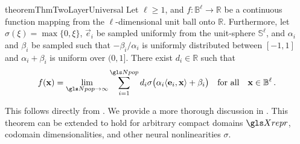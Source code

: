 \begin{restatable}{theorem}{ThmTwoLayerUniversal}
\label{thm:two_layer_universal}
Let $\ell \geq 1$, and $f : \mathbb{B}^\ell \longrightarrow \mathbb{R}$ be a continuous function mapping from the $\ell$-dimensional unit ball onto $\mathbb{R}$.
Furthermore, let $\sigma(\xi) = \max\{0, \xi\}$, $\vec e_i$ be sampled uniformly from the unit-sphere $\mathbb{S}^\ell$, and $\alpha_i$ and $\beta_i$ be sampled such that $-\beta_i / \alpha_i$ is uniformly distributed between $[-1, 1]$ and $\alpha_i + \beta_i$ is uniform over $(0, 1]$.
There exist $d_i \in \mathbb{R}$ such that
\begin{align}
	\vspace*{-0.5em}
	f(\vec x) = \lim_{\Npop \to \infty} \sum_{i = 1}^{\Npop} d_i \sigma\bigl( \alpha_i \langle \vec e_i, \vec x \rangle + \beta_i \bigr) \quad \text{for all} \quad \vec x \in \mathbb{B}^\ell \,.
	\label{eqn:two_layer_network}
\end{align}
\end{restatable}
\vspace*{-0.5em}\noindent
This follows directly from \citet{hornik1989multilayer}.
We provide a more thorough discussion in .
This theorem can be extended to hold for arbitrary compact domains $\Xrepr$, codomain dimensionalities, and other neural nonlinearities $\sigma$.


